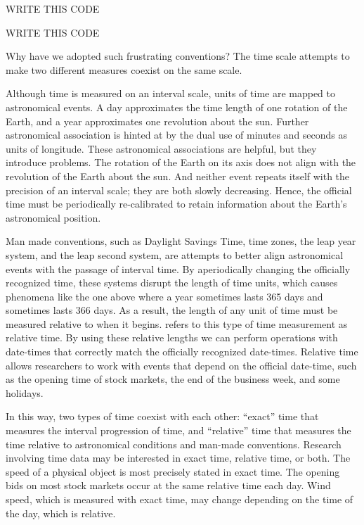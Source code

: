 \documentclass[article]{jss}
\begin{document}
 WRITE THIS CODE\\

 WRITE THIS CODE\\

Why have we adopted such frustrating conventions? The time scale attempts to make two different measures coexist on the same scale. 

Although time is measured on an interval scale, units of time are mapped to astronomical events. A day approximates the time length of one rotation of the Earth, and a year approximates one revolution about the sun.  Further astronomical association is hinted at by the dual use of minutes and seconds as units of longitude.  These astronomical associations are helpful, but they introduce problems. The rotation of the Earth on its axis does not align with the revolution of the Earth about the sun. And neither event repeats itself with the precision of an interval scale; they are both slowly decreasing. Hence, the official time must be periodically re-calibrated to retain information about the Earth's astronomical position. 

Man made conventions, such as Daylight Savings Time, time zones, the leap year system, and the leap second system, are attempts to better align astronomical events with the passage of interval time. By aperiodically changing the officially recognized time, these systems disrupt the length of time units, which causes phenomena like the one above where a year sometimes lasts 365 days and sometimes lasts 366 days. As a result, the length of any unit of time must be measured relative to when it begins.  refers to this type of time measurement as relative time. By using these relative lengths we can perform operations with date-times that correctly match the officially recognized date-times. Relative time allows researchers to work with events that depend on the official date-time, such as the opening time of stock markets, the end of the business week, and some holidays.

In this way, two types of time coexist with each other: ``exact'' time that measures the interval progression of time, and ``relative'' time that measures the time relative to astronomical conditions and man-made conventions. Research involving time data may be interested in exact time, relative time, or both. The speed of a physical object is most precisely stated in exact time. The opening bids on most stock markets occur at the same relative time each day.  Wind speed, which is measured with exact time, may change depending on the time of the day, which is relative. 
\end{document}
